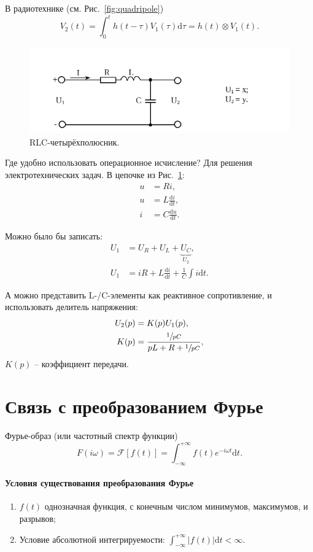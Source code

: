 \documentclass[12pt]{report}
\newcommand{\F}{\mathcal F}
\newcommand{\rd}{\mathrm d}
\renewcommand{\i}{i}
\begin{document}
В радиотехнике (см. Рис.~\ref{fig:quadripole})
\[
V_2(t) = \int_0^t h(t-\tau)V_1(\tau)\rd \tau = h(t)\otimes V_1(t).
\]

\begin{figure}[h]\centering
	\includegraphics[width=\linewidth]{RLC_quadripole}
	\caption{RLC-четырёхполюсник.\label{fig:RLC-quadripole}}
\end{figure}

Где удобно использовать операционное исчисление? Для решения электротехнических задач. В цепочке из Рис.~\ref{fig:RLC-quadripole}:
\begin{align*}
	u &= Ri, \tag{R-элемент} \\
	u &= L\frac{\rd i}{\rd t}, \tag{L-элемент} \\
	i &= C\frac{\rd u}{\rd t}. \tag{C-элемент}
\end{align*}

Можно было бы записать:
\begin{align*}
	U_1 &= U_R + U_L + \underbrace{U_C}_{U_2}, \\
	U_1 &= iR + L\frac{\rd i}{\rd t} + \frac1C\int i\rd t.
\end{align*}

А можно представить L-/C-элементы как реактивное сопротивление, и использовать делитель напряжения:
\begin{align*}
	U_2(p) &= K(p)U_1(p), \\
	K(p) &= \frac{\sfrac{1}{pC}}{pL + R + \sfrac{1}{pC}},
\end{align*}
$K(p)$ -- коэффициент передачи.

\section{Связь с преобразованием Фурье}
Фурье-образ (или частотный спектр функции)
\[
F(\i\omega)  =\F[f(t)]= \int_{-\infty}^{+\infty}f(t)e^{-\i\omega t}\rd t.
\]
\paragraph{Условия существования преобразования Фурье~\cite{Fourier-conditions}}
\begin{enumerate}
	\item $f(t)$ однозначная функция, с конечным числом минимумов, максимумов, и разрывов;
	\item Условие абсолютной интегрируемости: $\int_{-\infty}^{+\infty}|f(t)|\rd t < \infty$.
\end{enumerate}
\end{document}
